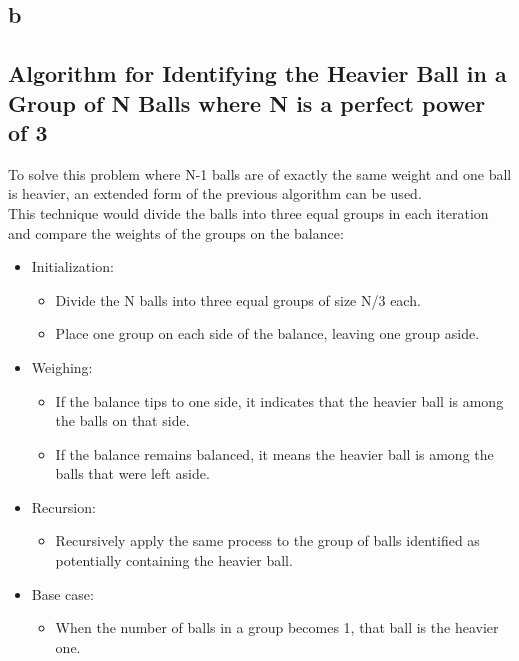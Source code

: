\documentclass{article}
\begin{document}
\subsection*{b}
\subsection*{Algorithm for Identifying the Heavier Ball in a Group of N Balls where N is a perfect power of 3}
To solve this problem where N-1 balls are of exactly the same weight and one ball is heavier, an extended form of the previous algorithm can be used.\\


This technique would divide the balls into three equal groups in each iteration and compare the weights of the groups on the balance:

\begin{itemize}
    \item Initialization:
          \begin{itemize}
              \item Divide the N balls into three equal groups of size N/3 each.
              \item Place one group on each side of the balance, leaving one group aside.
          \end{itemize}

    \item Weighing:
          \begin{itemize}
              \item If the balance tips to one side, it indicates that the heavier ball is among the balls on that side.
              \item If the balance remains balanced, it means the heavier ball is among the balls that were left aside.
          \end{itemize}

    \item Recursion:
          \begin{itemize}
              \item Recursively apply the same process to the group of balls identified as potentially containing the heavier ball.
          \end{itemize}

    \item Base case:
          \begin{itemize}
              \item When the number of balls in a group becomes 1, that ball is the heavier one.
          \end{itemize}


\end{itemize}
\end{document}
